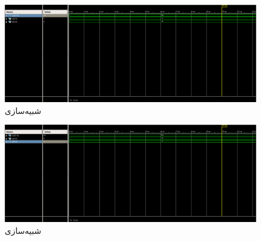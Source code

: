 \documentclass{article}
\begin{document}
\begin{figure}[H]
\centering
\includegraphics[width=16cm]{array-mul-tb}
\caption{شبیه‌سازی }
\end{figure}

\begin{figure}[H]
\centering
\includegraphics[width=16cm]{cs-mul-tb}
\caption{شبیه‌سازی }
\end{figure}




%

\noindent
\end{document}
